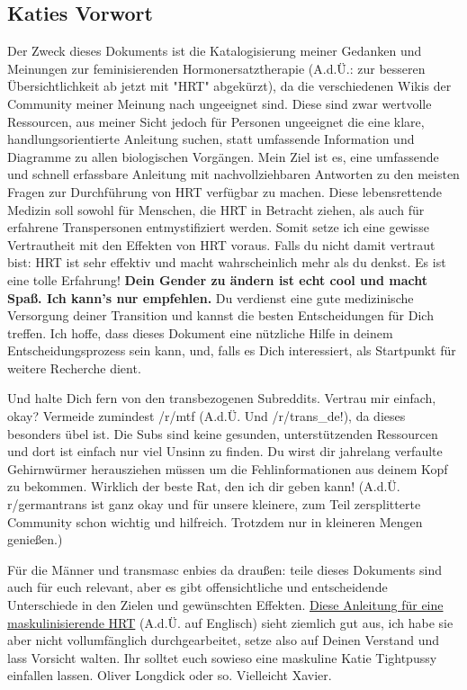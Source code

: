 \documentclass{article}
\begin{document}
\subsection*{Katies Vorwort}
Der Zweck dieses Dokuments ist die Katalogisierung meiner Gedanken und Meinungen zur feminisierenden Hormonersatztherapie (A.d.Ü.: zur besseren Übersichtlichkeit ab jetzt mit "HRT" abgekürzt), da die verschiedenen Wikis der Community meiner Meinung nach ungeeignet sind. Diese sind zwar wertvolle Ressourcen, aus meiner Sicht jedoch für Personen ungeeignet die eine klare, handlungsorientierte Anleitung suchen, statt umfassende Information und Diagramme zu allen biologischen Vorgängen. Mein Ziel ist es, eine umfassende und schnell erfassbare Anleitung mit nachvollziehbaren Antworten zu den meisten Fragen zur Durchführung von HRT verfügbar zu machen. Diese lebensrettende Medizin soll sowohl für Menschen, die HRT in Betracht ziehen, als auch für erfahrene Transpersonen entmystifiziert werden. Somit setze ich eine gewisse Vertrautheit mit den Effekten von HRT voraus. Falls du nicht damit vertraut bist: HRT ist sehr effektiv und macht wahrscheinlich mehr als du denkst. Es ist eine tolle Erfahrung! \textbf{Dein Gender zu ändern ist echt cool und macht Spaß. Ich kann's nur empfehlen.} Du verdienst eine gute medizinische Versorgung deiner Transition und kannst die besten Entscheidungen für Dich treffen. Ich hoffe, dass dieses Dokument eine nützliche Hilfe in deinem Entscheidungsprozess sein kann, und, falls es Dich interessiert, als Startpunkt für weitere Recherche dient.

Und halte Dich fern von den transbezogenen Subreddits. Vertrau mir einfach, okay? Vermeide zumindest /r/mtf (A.d.Ü. Und /r/trans\_de!), da dieses besonders übel ist. Die Subs sind keine gesunden, unterstützenden Ressourcen und dort ist einfach nur viel Unsinn zu finden. Du wirst dir jahrelang verfaulte Gehirnwürmer herausziehen müssen um die Fehlinformationen aus deinem Kopf zu bekommen. Wirklich der beste Rat, den ich dir geben kann! (A.d.Ü. r/germantrans ist ganz okay und für unsere kleinere, zum Teil zersplitterte Community schon wichtig und hilfreich. Trotzdem nur in kleineren Mengen genießen.)

Für die Männer und transmasc enbies da draußen: teile dieses Dokuments sind auch für euch relevant, aber es gibt offensichtliche und entscheidende Unterschiede in den Zielen und gewünschten Effekten. \href{https://mega.nz/folder/cfwSmBbY#ify6kaueB8SdDD1v12t2Dw}{Diese Anleitung für eine maskulinisierende HRT} (A.d.Ü. auf Englisch) sieht ziemlich gut aus, ich habe sie aber nicht vollumfänglich durchgearbeitet, setze also auf Deinen Verstand und lass Vorsicht walten. Ihr solltet euch sowieso eine maskuline Katie Tightpussy einfallen lassen. Oliver Longdick oder so. Vielleicht Xavier. 
\end{document}
